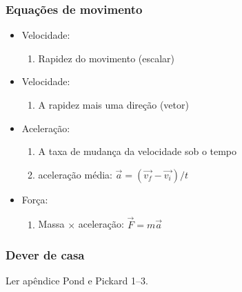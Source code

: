 \begin{frame}
\frametitle{Equações de movimento}

  \begin{itemize}[<+-| alert@+>]
    \item Velocidade:
      \begin{enumerate}[<+-| alert@+>]
        \item Rapidez do movimento (escalar)
      \end{enumerate}
    \item Velocidade:
      \begin{enumerate}[<+-| alert@+>]
        \item A rapidez mais uma direção (vetor)
      \end{enumerate}
    \item Aceleração:
      \begin{enumerate}[<+-| alert@+>]
        \item A taxa de mudança da velocidade sob o tempo
        \item aceleração média: $\vec{a} = (\vec{v_f} - \vec{v_i})/t$
      \end{enumerate}
    \item Força:
      \begin{enumerate}[<+-| alert@+>]
        \item Massa $\times$ aceleração: $\vec{F} = m\vec{a}$
      \end{enumerate}
  \end{itemize}
\end{frame}

\begin{frame}
\frametitle{Dever de casa}
    \begin{block}{}
        Ler apêndice Pond e Pickard 1--3.
    \end{block}
\end{frame}


